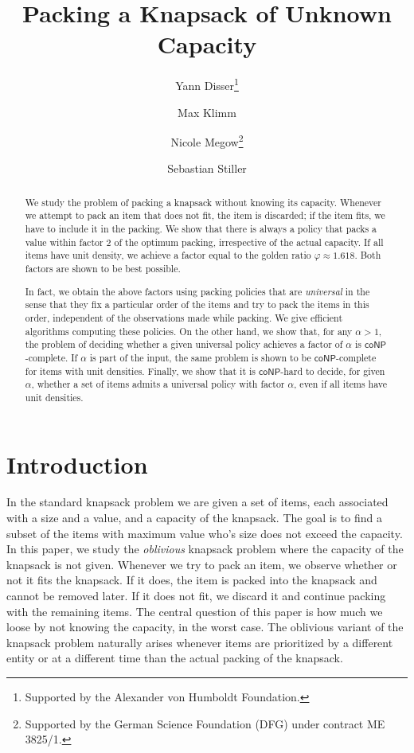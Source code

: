 \documentclass[11pt]{article}
\newcommand{\classcoNP}{\mathsf{coNP}}
\begin{document}
\title{Packing a Knapsack of Unknown Capacity}


\author{Yann Disser\thanks{Supported by the Alexander von Humboldt Foundation.}}
\author{Max Klimm}
\author{Nicole Megow\thanks{Supported by the German Science Foundation (DFG) under contract  ME 3825/1.}}
\author{Sebastian Stiller}

\maketitle
\begin{abstract}
We study the problem of packing a knapsack without knowing its capacity.
Whenever we attempt to pack an item that does not fit, the item is
discarded; if the item fits, we have to include it in the packing.
We show that there is always a policy that packs a value within factor
2 of the optimum packing, irrespective of the actual capacity. If
all items have unit density, we achieve a factor equal to the golden
ratio $\varphi\approx1.618$. Both factors are shown to be best possible.

In fact, we obtain the above factors using packing policies that are
\emph{universal} in the sense that they fix a particular order of
the items and try to pack the items in this order, independent of
the observations made while packing. We give efficient algorithms
computing these policies. On the other hand, we show that, for any
$\alpha>1$, the problem of deciding whether a given universal policy
achieves a factor of $\alpha$ is $\classcoNP$-complete. If $\alpha$
is part of the input, the same problem is shown to be $\classcoNP$-complete
for items with unit densities. Finally, we show that it is $\classcoNP$-hard
to decide, for given $\alpha$, whether a set of items admits a universal
policy with factor $\alpha$, even if all items have unit densities.
\end{abstract}
\smallskip
\section{Introduction}

In the standard knapsack problem we are given a set of items, each
associated with a size and a value, and a capacity of the knapsack.
The goal is to find a subset of the items with maximum value who's
size does not exceed the capacity. In this paper, we study the \emph{oblivious
}knapsack problem where the capacity of the knapsack is not given.
Whenever we try to pack an item, we observe whether or not it fits
the knapsack. If it does, the item is packed into the knapsack and
cannot be removed later. If it does not fit, we discard it and continue
packing with the remaining items. The central question of this paper
is how much we loose by not knowing the capacity, in the worst case.
The oblivious variant of the knapsack problem naturally arises whenever
items are prioritized by a different entity or at a different time
than the actual packing of the knapsack.
\end{document}
